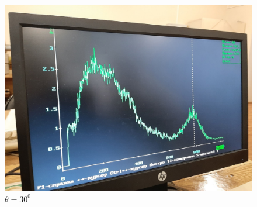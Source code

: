 \documentclass[a4paper, 12pt]{article}
\begin{document}
\begin{figure}[h]
\begin{minipage}[h]{0.3\linewidth}
\includegraphics[width = 1\linewidth]{30.jpg}
\caption{$\theta = 30^0$}
\end{minipage}
\end{figure}
\end{document}
